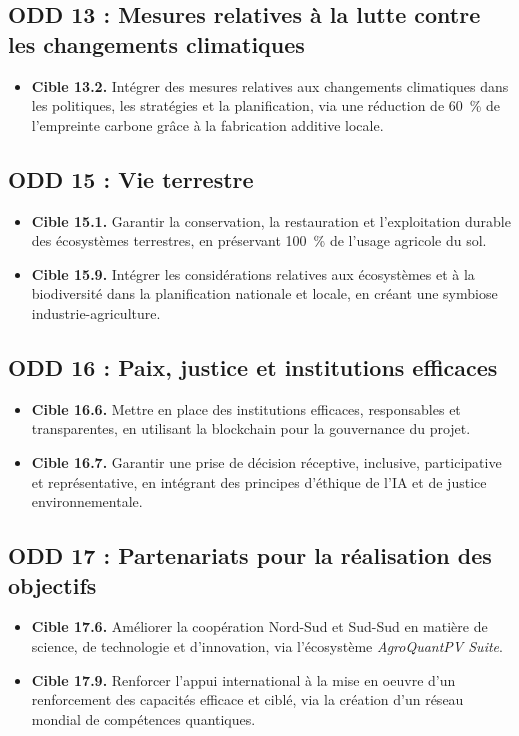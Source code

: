 \documentclass[12pt, a4paper]{article}
\begin{document}
\subsection{ODD 13 : Mesures relatives à la lutte contre les changements climatiques}
\begin{itemize}
    \item \textbf{Cible 13.2.} Intégrer des mesures relatives aux changements climatiques dans les politiques, les stratégies et la planification, via une réduction de \SI{60}{\percent} de l'empreinte carbone grâce à la fabrication additive locale.
\end{itemize}

\subsection{ODD 15 : Vie terrestre}
\begin{itemize}
    \item \textbf{Cible 15.1.} Garantir la conservation, la restauration et l'exploitation durable des écosystèmes terrestres, en préservant \SI{100}{\percent} de l'usage agricole du sol.
    \item \textbf{Cible 15.9.} Intégrer les considérations relatives aux écosystèmes et à la biodiversité dans la planification nationale et locale, en créant une symbiose industrie-agriculture.
\end{itemize}

\subsection{ODD 16 : Paix, justice et institutions efficaces}
\begin{itemize}
    \item \textbf{Cible 16.6.} Mettre en place des institutions efficaces, responsables et transparentes, en utilisant la blockchain pour la gouvernance du projet.
    \item \textbf{Cible 16.7.} Garantir une prise de décision réceptive, inclusive, participative et représentative, en intégrant des principes d'éthique de l'IA et de justice environnementale.
\end{itemize}

\subsection{ODD 17 : Partenariats pour la réalisation des objectifs}
\begin{itemize}
    \item \textbf{Cible 17.6.} Améliorer la coopération Nord-Sud et Sud-Sud en matière de science, de technologie et d’innovation, via l'écosystème \textit{AgroQuantPV Suite}.
    \item \textbf{Cible 17.9.} Renforcer l'appui international à la mise en oeuvre d'un renforcement des capacités efficace et ciblé, via la création d'un réseau mondial de compétences quantiques.
\end{itemize}
\end{document}
